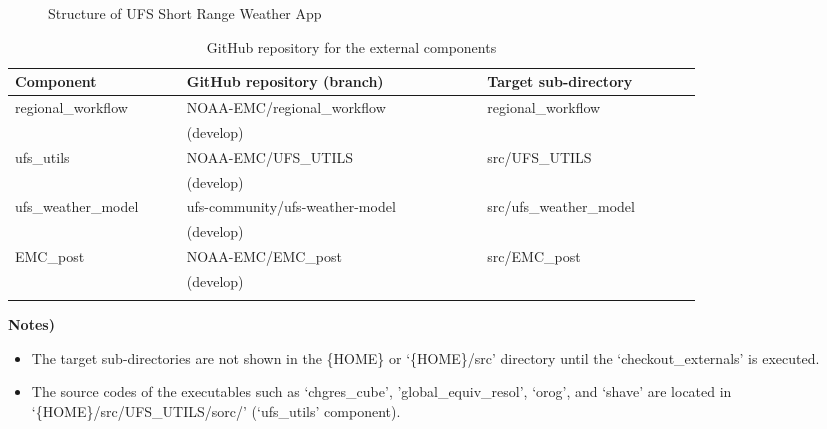 \documentclass[11pt,fleqn]{report}              %
\begin{document}
\begin{figure}[ht!]
\centering
\begin{minipage}{0.65\linewidth}
\end{minipage}
\caption{Structure of UFS Short Range Weather App}
\label{figure:srwapp_dir}
\end{figure}

{
\fontsize{10}{12}\selectfont
\begin{longtable}{ p{0.2\linewidth} | p{0.35\linewidth}  | p{0.25\linewidth}  }
\hline
\hline
 Component & GitHub repository (branch) & Target sub-directory \\
\hline
 regional\_workflow & NOAA-EMC/regional\_workflow & regional\_workflow \\
 & (develop) & \\ 
\hdashline
 ufs\_utils & NOAA-EMC/UFS\_UTILS & src/UFS\_UTILS \\
  & (develop) & \\
 ufs\_weather\_model & ufs-community/ufs-weather-model & src/ufs\_weather\_model  \\
  & (develop) & \\
 EMC\_post & NOAA-EMC/EMC\_post & src/EMC\_post \\
  & (develop) & \\
\hline
\caption{GitHub repository for the external components}
\label{table:ext_comp_github}
\end{longtable}
}

{\bf Notes)}
\begin{itemize}
\item The target sub-directories are not shown in the \{HOME\} or `\{HOME\}/src' directory until the `checkout\_externals' is executed.
\item The source codes of the executables such as `chgres\_cube', 'global\_equiv\_resol', `orog', and `shave' are located in `\{HOME\}/src/UFS\_UTILS/sorc/' (`ufs\_utils' component).
\end{itemize}
\end{document}
